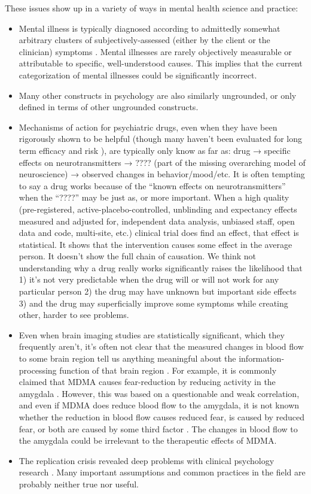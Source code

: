 \documentclass[12pt,letterpaper]{book}
\begin{document}
These issues show up in a variety of ways in mental health science and practice:
\begin{itemize}
    \item Mental illness is typically diagnosed according to admittedly somewhat arbitrary clusters of subjectively-assessed (either by the client or the clinician) symptoms \cite{apaDSM}. Mental illnesses are rarely objectively measurable or attributable to specific, well-understood causes. This implies that the current categorization of mental illnesses could be significantly incorrect.
    \item Many other constructs in psychology are also similarly ungrounded, or only defined in terms of other ungrounded constructs.
    \item Mechanisms of action for psychiatric drugs, even when they have been rigorously shown to be helpful (though many haven’t been evaluated for long term efficacy and risk \cite{leuchtDecline}), are typically only know as far as: drug → specific effects on neurotransmitters → ???? (part of the missing overarching model of neuroscience) → observed changes in behavior/mood/etc. It is often tempting to say a drug works because of the “known effects on neurotransmitters” when the “????” may be just as, or more important. When a high quality (pre-registered, active-placebo-controlled, unblinding and expectancy effects measured and adjusted for, independent data analysis, unbiased staff, open data and code, multi-site, etc.) clinical trial does find an effect, that effect is statistical. It shows that the intervention causes some effect in the average person. It doesn’t show the full chain of causation. We think not understanding why a drug really works significantly raises the likelihood that 1) it's not very predictable when the drug will or will not work for any particular person 2) the drug may have unknown but important side effects 3) and the drug may superficially improve some symptoms while creating other, harder to see problems.
    \item Even when brain imaging studies are statistically significant, which they frequently aren't, it's often not clear that the measured changes in blood flow to some brain region tell us anything meaningful about the information-processing function of that brain region \cite{jonas2017microprocessor,dewit2016neuroimaging,alikoEntireBrain}. For example, it is commonly claimed that MDMA causes fear-reduction by reducing activity in the amygdala \cite{fedduciaMDMAMemoryReconsolidation}. However, this was based on a questionable and weak correlation, and even if MDMA does reduce blood flow to the amygdala, it is not known whether the reduction in blood flow causes reduced fear, is caused by reduced fear, or both are caused by some third factor \cite{mdmaNeuroimaging}. The changes in blood flow to the amygdala could be irrelevant to the therapeutic effects of MDMA.
    \item The replication crisis revealed deep problems with clinical psychology research \cite{therapyReplicationCrisis}. Many important assumptions and common practices in the field are probably neither true nor useful.
\end{itemize}
\end{document}
